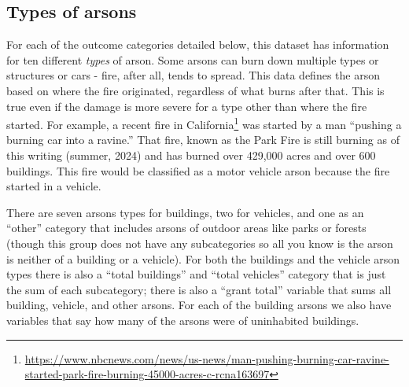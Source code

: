 \documentclass[
]{krantz}
\renewcommand{\href}[2]{#2\footnote{\url{#1}}}
\begin{document}
\subsection{Types of arsons}\label{arsonType}

For each of the outcome categories detailed below, this
dataset has information for ten different \emph{types} of
arson. Some arsons can burn down multiple types or
structures or cars - fire, after all, tends to spread. This
data defines the arson based on where the fire originated,
regardless of what burns after that. This is true even if
the damage is more severe for a type other than where the
fire started. For example, a
\href{https://www.nbcnews.com/news/us-news/man-pushing-burning-car-ravine-started-park-fire-burning-45000-acres-c-rcna163697}{recent
fire in California} was started by a man ``pushing a burning
car into a ravine.'' That fire, known as the Park Fire is
still burning as of this writing (summer, 2024) and has
burned over 429,000 acres and over 600 buildings. This fire
would be classified as a motor vehicle arson because the
fire started in a vehicle.

There are seven arsons types for buildings, two for
vehicles, and one as an ``other'' category that includes
arsons of outdoor areas like parks or forests (though this
group does not have any subcategories so all you know is the
arson is neither of a building or a vehicle). For both the
buildings and the vehicle arson types there is also a
``total buildings'' and ``total vehicles'' category that is
just the sum of each subcategory; there is also a ``grant
total'' variable that sums all building, vehicle, and other
arsons. For each of the building arsons we also have
variables that say how many of the arsons were of
uninhabited buildings.
\end{document}
